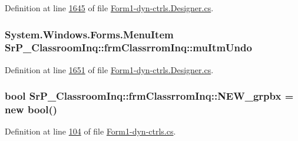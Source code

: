 \-Definition at line \hyperlink{_form1-dyn-ctrls_8_designer_8cs_source_l01645}{1645} of file \hyperlink{_form1-dyn-ctrls_8_designer_8cs_source}{\-Form1-\/dyn-\/ctrls.\-Designer.\-cs}.

\hypertarget{class_sr_p___classroom_inq_1_1frm_classrrom_inq_aa3e4ca1c9b69ec8008d53de0a7727b9f}{
\subsubsection[{mu\-Itm\-Undo}]{\setlength{\rightskip}{0pt plus 5cm}\-System.\-Windows.\-Forms.\-Menu\-Item {\bf \-Sr\-P\-\_\-\-Classroom\-Inq\-::frm\-Classrrom\-Inq\-::mu\-Itm\-Undo}}}
\label{class_sr_p___classroom_inq_1_1frm_classrrom_inq_aa3e4ca1c9b69ec8008d53de0a7727b9f}


\-Definition at line \hyperlink{_form1-dyn-ctrls_8_designer_8cs_source_l01651}{1651} of file \hyperlink{_form1-dyn-ctrls_8_designer_8cs_source}{\-Form1-\/dyn-\/ctrls.\-Designer.\-cs}.

\hypertarget{class_sr_p___classroom_inq_1_1frm_classrrom_inq_aaf5a152b29ae06c11e8e25f0eabf454d}{
\subsubsection[{\-N\-E\-W\-\_\-grpbx}]{\setlength{\rightskip}{0pt plus 5cm}bool {\bf \-Sr\-P\-\_\-\-Classroom\-Inq\-::frm\-Classrrom\-Inq\-::\-N\-E\-W\-\_\-grpbx} = new bool()}}
\label{class_sr_p___classroom_inq_1_1frm_classrrom_inq_aaf5a152b29ae06c11e8e25f0eabf454d}


\-Definition at line \hyperlink{_form1-dyn-ctrls_8cs_source_l00104}{104} of file \hyperlink{_form1-dyn-ctrls_8cs_source}{\-Form1-\/dyn-\/ctrls.\-cs}.

